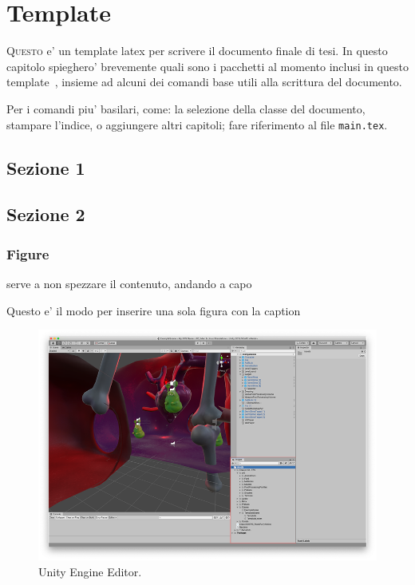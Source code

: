\chapter*{Template} %
\minitoc %


\lettrine{Q}{uesto} e' un template latex per scrivere il documento finale di tesi. In questo capitolo spieghero' brevemente quali sono i pacchetti al momento inclusi in questo template~, insieme ad alcuni dei comandi base utili alla scrittura del documento.


Per i comandi piu' basilari, come: la selezione della classe del documento, stampare l'indice, o aggiungere altri capitoli; fare riferimento al file \verb|main.tex|.

\section{Sezione 1}

\section{Sezione 2}

\subsection{Figure}

\mbox{} serve a non spezzare il contenuto, andando a capo

Questo e' il modo per inserire una sola figura con la caption~\cite{doc:unityengine}

\begin{figure}[!ht]
    \centering
    \includegraphics[width=0.95\columnwidth]{gfx/imgs/introduction/unity_editor.png}
    \caption{Unity Engine Editor.}
    \label{fig:unity-engine-editor}
\end{figure}

